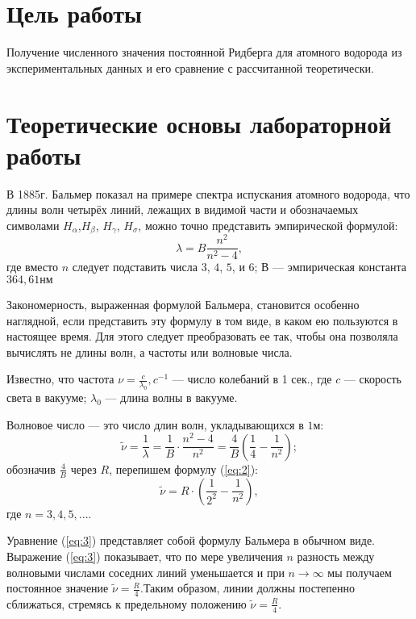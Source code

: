 \documentclass[12pt]{article}
\let\oldref\ref
\renewcommand{\ref}[1]{(\oldref{#1})}
\begin{document}
    \section*{Цель работы}

    Получение  численного  значения  постоянной  Ридберга  для  атомного водорода из экспериментальных данных и его сравнение с рассчитанной теоретически.

    \section*{Теоретические основы лабораторной работы}

    В 1885г. Бальмер показал на примере спектра испускания атомного водорода, что длины волн четырёх линий, лежащих в видимой части и обозначаемых символами $ H_\alpha $,$ H_\beta $, $ H_\gamma $, $ H_\sigma $, можно точно представить эмпирической формулой:
    \begin{equation}
        \label{eq:1}
        \lambda = B \frac{n^2}{n^2-4},
    \end{equation}
    где вместо $ n $ следует подставить числа $ 3 $, $ 4 $, $ 5 $, и $ 6 $; $ В $ --- эмпирическая константа $ 364,61нм $

    Закономерность, выраженная формулой Бальмера, становится особенно наглядной, если представить эту формулу в том виде, в каком ею пользуются в настоящее время. Для этого следует преобразовать ее так, чтобы она позволяла вычислять не длины волн, а частоты или волновые числа.

    Известно, что частота $ \nu = \frac{c}{\lambda_0}, c^{-1}$ --- число колебаний в 1 сек., где $ c $ --- скорость света в вакууме; $ \lambda_0 $ --- длина волны в вакууме.

    Волновое число --- это число длин волн, укладывающихся в $ 1 м $:
    \begin{equation}
        \label{eq:2}
        \widetilde{\nu} = \frac{1}{\lambda} = \frac{1}{B} \cdot \frac{n^2 - 4}{n^2} = \frac{4}{B} \left( \frac{1}{4} - \frac{1}{n^2} \right);
    \end{equation}
    обозначив $ \frac{4}{B} $ через $ R $, перепишем формулу \ref{eq:2}:
    \begin{equation}
        \label{eq:3}
        \widetilde{\nu} = R \cdot \left( \frac{1}{2^2} - \frac{1}{n^2} \right),
    \end{equation}
    где $ n = 3, 4, 5, ... $.

    Уравнение \ref{eq:3}  представляет  собой формулу   Бальмера   в   обычном   виде. Выражение \ref{eq:3}  показывает,  что  по  мере увеличения  $ n $ разность  между  волновыми числами  соседних  линий  уменьшается  и при $ n \to \infty $ мы   получаем   постоянное значение $ \widetilde{\nu} = \frac{R}{4} $.Таким  образом,  линии должны постепенно сближаться, стремясь к предельному  положению $ \widetilde{\nu} = \frac{R}{4} $.
\end{document}
